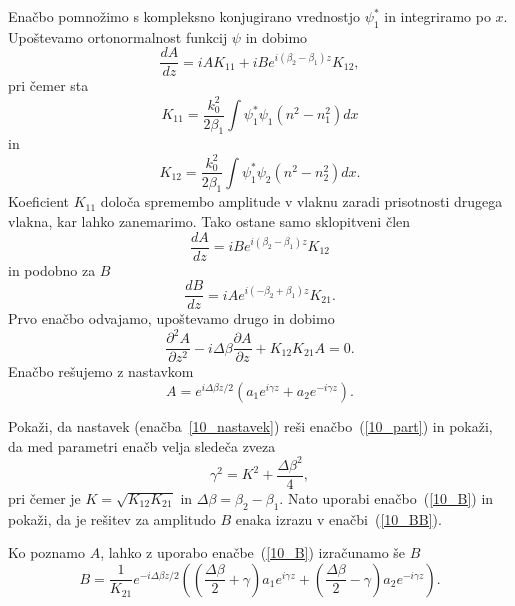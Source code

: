 Enačbo pomnožimo s kompleksno konjugirano vrednostjo $\psi_1^*$ in integriramo po $x$.
Upoštevamo ortonormalnost funkcij $\psi$ in dobimo 
\begin{equation}
\frac{dA}{dz} = i A K_{11}+i B e^{i(\beta_2-\beta_1)z} K_{12},
\end{equation}
pri čemer sta
\begin{equation}
K_{11}= \frac{k_0^2}{2 \beta_1}\int\psi_1^*\psi_1 (n^2-n_1^2)dx
\end{equation}
in 
\begin{equation}
K_{12}= \frac{k_0^2}{2 \beta_1}\int\psi_1^*\psi_2 (n^2-n_2^2)dx.
\end{equation}
Koeficient $K_{11}$ določa spremembo amplitude v vlaknu zaradi prisotnosti 
drugega vlakna, kar lahko zanemarimo. Tako ostane samo sklopitveni člen
\begin{equation}
\frac{dA}{dz} = i B e^{i(\beta_2-\beta_1)z} K_{12}
\label{10_B}
\end{equation}
in podobno za $B$
\begin{equation}
\frac{dB}{dz} = i A e^{i(-\beta_2+\beta_1)z} K_{21}.
\end{equation}
Prvo enačbo odvajamo, upoštevamo drugo in dobimo
\begin{equation}
\frac{\partial^2 A}{\partial z^2}-i \Delta \beta \frac{\partial A}{\partial z} + K_{12}K_{21}A = 0.
\label{10_part}
\end{equation}
Enačbo rešujemo z nastavkom 
\begin{equation}
A = e^{i \Delta \beta z/2}\left( a_1 e^{i \gamma z} + a_2 e^{-i \gamma z}\right).
\label{10_nastavek}
\end{equation}
\begin{definition}
 Pokaži, da  nastavek (enačba~\ref{10_nastavek}) reši enačbo~(\ref{10_part}) in pokaži,
 da med parametri enačb velja sledeča zveza
 \begin{equation}
 \gamma^2 = K^2 + \frac{\Delta \beta ^2}{4},
 \end{equation}
 pri čemer je $K = \sqrt{K_{12}K_{21}}$ in $\Delta \beta = \beta_2 - \beta_1$. 
 Nato uporabi enačbo~(\ref{10_B}) in pokaži, da je rešitev za amplitudo $B$
 enaka izrazu v enačbi~(\ref{10_BB}).
\end{definition}
Ko poznamo $A$, lahko z uporabo enačbe~(\ref{10_B}) izračunamo še $B$
\begin{equation}
B = \frac{1}{K_{21}}
e^{-i \Delta \beta z/2}\left(\left(\frac{\Delta \beta}{2} +\gamma \right) a_1 e^{i \gamma z} + 
\left(\frac{\Delta \beta}{2} -\gamma \right)a_2 e^{-i \gamma z}\right).
\label{10_BB}
\end{equation}
